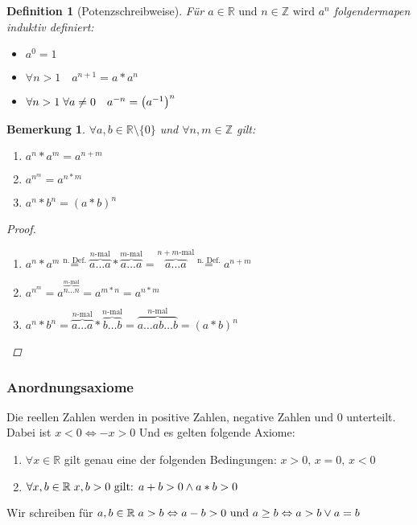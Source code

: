 \documentclass[a4paper,titlepage,oneside]{article}
\def\Z{\ensuremath{\mathbb{Z}} }
\def\R{\ensuremath{\mathbb{R}} }
\def\fa{\ensuremath{\forall}}
\def\lor{\ensuremath{\vee}}
\def\land{\ensuremath{\wedge}}
\def\sp{\hspace{0,1cm}}
\theoremstyle{thmstyle}
\newtheorem{defi}[satz]{Definition}
\newtheorem{bem}[satz]{Bemerkung}
\begin{document}
\begin{defi}[Potenzschreibweise]
Für \(a \in \R \text{ und }n \in \Z \text{ wird }a^n\) folgendermapen induktiv definiert:
\begin{itemize}
\item \(a^0 = 1\)
\item \(\fa n > 1 \quad a^{n+1} = a * a^n \)
\item \(\fa n > 1 \sp \fa a \ne 0 \quad a^{-n} = \left(a^{-1}\right)^n\)
\end{itemize}
\end{defi}
\newpage

\begin{bem}
\(\fa a, b \in \R \setminus \{0\} \) und \( \fa n, m \in \Z\) gilt:
\begin{enumerate}[label=(\arabic*)]
\item $\displaystyle a^n * a^m = a^{n+m} $
\item $\displaystyle a^{n^m} = a^{n * m} $
\item $\displaystyle a^n * b^n = (a * b)^n $
\end{enumerate}
\begin{proof}\sp
\begin{enumerate}[label=(\arabic*)]
\item $\displaystyle a^n * a^m \overset{\text{n. Def.}}{=} \overbrace{a \dots a}^{n\text{-mal}}*\overbrace{a \dots a}^{m\text{-mal}} = \overbrace{a \dots a}^{n+m\text{-mal}} \overset{\text{n. Def.}}{=} a^{n+m}$
\item $\displaystyle a^{n^m} = a^{\overbrace{n \dots n}^{m\text{-mal}}} = a^{m * n} = a^{n*m}$
\item $\displaystyle a^n * b^n = \overbrace{a \dots a}^{n\text{-mal}}*\overbrace{b \dots b}^{n\text{-mal}} = \overbrace{a \dots a b \dots b}^{n\text{-mal}} = (a*b)^{n}$
\end{enumerate}
\end{proof}
\end{bem}

\subsubsection{Anordnungsaxiome}
Die reellen Zahlen werden in positive Zahlen, negative Zahlen und 0 unterteilt. Dabei ist \(x < 0 \Leftrightarrow -x > 0\) Und es gelten folgende Axiome:
\begin{enumerate}[label=(\arabic*)]
\item \(\fa x \in \R \) gilt genau eine der folgenden Bedingungen: \(x > 0\text{, } x = 0\text{, } x < 0 \)
\item \(\fa x,b \in \R \sp x,b > 0 \text{ gilt: } a + b > 0 \land a * b > 0\)
\end{enumerate}
Wir schreiben für \(a, b \in \R \sp a > b \Leftrightarrow a - b > 0\text{ und }a \ge b \Leftrightarrow a > b \lor a = b \)
\end{document}

